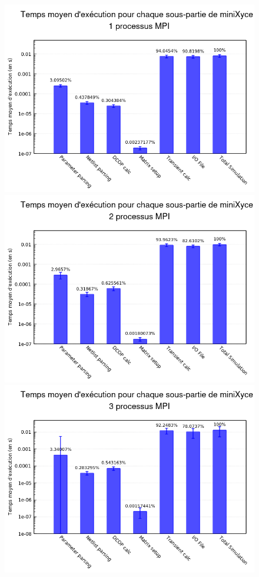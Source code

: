 \documentclass[11pt,a4paper,oneside]{memoir}
\theoremstyle{definition}
\theoremstyle{remark}
\theoremstyle{plain}
\begin{document}
\begin{figure}
\begin{center}
\includegraphics[scale=0.45]{Images-Rapport/Profil_miniXyce/Profil_miniXyce_parallele1.png}
\includegraphics[scale=0.45]{Images-Rapport/Profil_miniXyce/Profil_miniXyce_parallele2.png}
\includegraphics[scale=0.45]{Images-Rapport/Profil_miniXyce/Profil_miniXyce_parallele3.png}

\end{center}
\end{figure}
\end{document}
